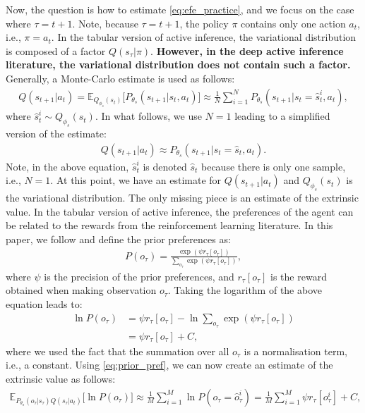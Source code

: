 \documentclass[twoside,11pt]{article}
\begin{document}
Now, the question is how to estimate \eqref{eq:efe_practice}, and we focus on the case where $\tau = t + 1$. Note, because $\tau = t+1$, the policy $\pi$ contains only one action $a_t$, i.e., $\pi = a_t$. In the tabular version of active inference, the variational distribution is composed of a factor $Q(s_\tau | \pi)$. \textbf{However, in the deep active inference literature, the variational distribution does not contain such a factor.} Generally, a Monte-Carlo estimate is used as follows:
\begin{align}
Q(s_{t+1} | a_t) = \mathbb{E}_{Q_{\phi_s}(s_t)}\big[P_{\theta_s}(s_{t+1}|s_t, a_t)\big] \approx \frac{1}{N} \sum_{i = 1}^N P_{\theta_s}(s_{t+1}|s_t = \hat{s}_t^i, a_t), \label{eq:vd_or_gm}
\end{align}
where $\hat{s}_t^i \sim Q_{\phi_s}(s_t)$. In what follows, we use $N=1$ leading to a simplified version of the estimate:
\begin{align}
Q(s_{t+1} | a_t) \approx P_{\theta_s}(s_{t+1}|s_t = \hat{s}_t, a_t).
\end{align}
Note, in the above equation, $\hat{s}_t^i$ is denoted $\hat{s}_t$ because there is only one sample, i.e., $N=1$. At this point, we have an estimate for $Q(s_{t+1} | a_t)$ and $Q_{\phi_s}(s_t)$ is the variational distribution. The only missing piece is an estimate of the extrinsic value. In the tabular version of active inference, the preferences of the agent can be related to the rewards from the reinforcement learning literature. In this paper, we follow \citep{dacosta2020relationship} and define the prior preferences as:
\begin{align*}
P(o_\tau) = \frac{\exp(\psi r_\tau[o_\tau])}{\sum_{o_\tau} \exp(\psi r_\tau[o_\tau])},
\end{align*}
where $\psi$ is the precision of the prior preferences, and $r_\tau[o_\tau]$ is the reward obtained when making observation $o_\tau$. Taking the logarithm of the above equation leads to:
\begin{align}
\ln P(o_\tau) &= \psi r_\tau[o_\tau] - \ln \sum_{o_\tau} \exp(\psi r_\tau[o_\tau])\nonumber\\
&= \psi r_\tau[o_\tau] + C, \label{eq:prior_pref}
\end{align}
where we used the fact that the summation over all $o_\tau$ is a normalisation term, i.e., a constant. Using \eqref{eq:prior_pref}, we can now create an estimate of the extrinsic value as follows:
\begin{align*}
\mathbb{E}_{P_{\theta_o}(o_\tau|s_\tau)Q(s_\tau | a_t)}\big[\ln P(o_\tau)\big] \approx \frac{1}{M} \sum_{i = 1}^M \ln P(o_\tau = \hat{o}_\tau^i) = \frac{1}{M} \sum_{i = 1}^M \psi r_\tau[o_\tau^i] + C,
\end{align*}
\end{document}
